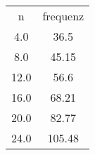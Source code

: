 \begin{table}
\begin{tabular}{cc}
n & frequenz \\
4.0 & 36.5 \\
8.0 & 45.15 \\
12.0 & 56.6 \\
16.0 & 68.21 \\
20.0 & 82.77 \\
24.0 & 105.48 \\
\end{tabular}
\end{table}
